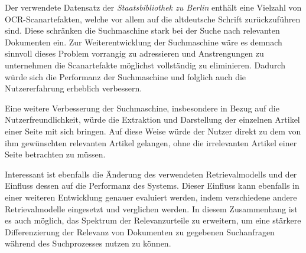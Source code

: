 \documentclass[11pt,a4paper, halfparskip]{scrartcl}
\begin{document}
Der verwendete Datensatz der \textit{Staatsbibliothek zu Berlin} enthält eine Vielzahl von OCR-Scanartefakten, welche vor allem auf die altdeutsche Schrift zurückzuführen sind.
Diese schränken die Suchmaschine stark bei der Suche nach relevanten Dokumenten ein. 
Zur Weiterentwicklung der Suchmaschine wäre es demnach sinnvoll dieses Problem vorrangig zu adressieren und Anstrengungen zu unternehmen die Scanartefakte möglichst vollständig zu eliminieren.
Dadurch würde sich die Performanz der Suchmaschine und folglich auch die Nutzererfahrung erheblich verbessern.

Eine weitere Verbesserung der Suchmaschine, insbesondere in Bezug auf die Nutzerfreundlichkeit, würde die Extraktion und Darstellung der einzelnen Artikel einer Seite mit sich bringen.
Auf diese Weise würde der Nutzer direkt zu dem von ihm gewünschten relevanten Artikel gelangen, ohne die irrelevanten Artikel einer Seite betrachten zu müssen.  

Interessant ist ebenfalls die Änderung des verwendeten Retrievalmodells und der Einfluss dessen auf die Performanz des Systems.
Dieser Einfluss kann ebenfalls in einer weiteren Entwicklung genauer evaluiert werden, indem verschiedene andere Retrievalmodelle eingesetzt und verglichen werden.
In diesem Zusammenhang ist es auch möglich, das Spektrum der Relevanzurteile zu erweitern, um eine stärkere Differenzierung der Relevanz von Dokumenten zu gegebenen Suchanfragen während des Suchprozesses nutzen zu können.







\end{document}
